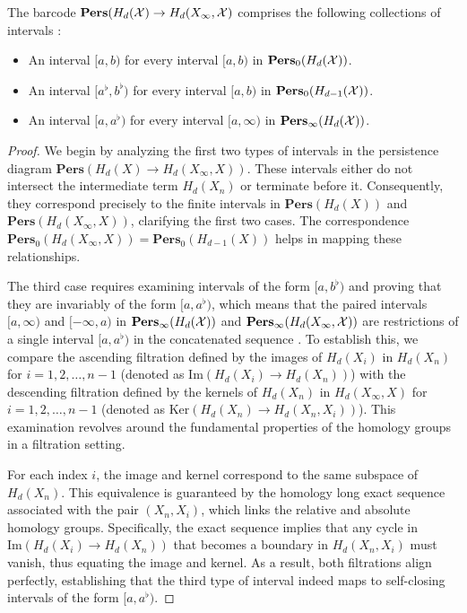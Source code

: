 \begin{corollary}
	The barcode $\textbf{Pers}(H_{d}({\mathcal{X}}) \rightarrow H_{d}(X_{\infty}, {\mathcal{X}})$ comprises
	the following collections of intervals \cite[§2.5]{de2011dualities}:
	\begin{itemize}
		\item An interval $[a,b)$ for every interval $[a,b)$ in $\textbf{Pers}_{0}(H_{d}
			({\mathcal{X}}))$.

		\item An interval $[a^{\flat}, b^{\flat})$ for every interval $[a,b)$ in $\textbf
			{Pers}_{0}(H_{d-1}({\mathcal{X}}))$.

		\item An interval $[a,a^{\flat})$ for every interval $[a,\infty)$ in $\textbf
			{Pers}_{\infty}(H_{d}({\mathcal{X}}))$.
	\end{itemize}
\end{corollary}

\begin{proof}
	We begin by analyzing the first two types of intervals in the persistence diagram
	$\textbf{Pers}(H_{d}(X) \to H_{d}(X_{\infty}, X))$. These intervals either do
	not intersect the intermediate term $H_{d}(X_{n})$ or terminate before it. Consequently,
	they correspond precisely to the finite intervals in $\textbf{Pers}(H_{d}(X))$
	and $\textbf{Pers}(H_{d}(X_{\infty}, X))$, clarifying the first two cases. The
	correspondence
	$\textbf{Pers}_{0}(H_{d}(X_{\infty}, X)) = \textbf{Pers}_{0}(H_{d-1}(X))$
	helps in mapping these relationships.

	The third case requires examining intervals of the form $[a, b^{\flat})$ and
	proving that they are invariably of the form $[a, a^{\flat})$, which means that
	the paired intervals $[a,\infty)$ and $[-\infty,a)$ in $\textbf{Pers}_{\infty}(
	H_{d}({\mathcal{X}}))$ and $\textbf{Pers}_{\infty}(H_{d}(X_{\infty}, {\mathcal{X}}))$ are restrictions
	of a single interval $[a,a^{\flat})$ in the concatenated sequence \cite[p.6]{de2011dualities}.
	To establish this, we compare the ascending filtration defined by the images of
	$H_{d}(X_{i})$ in $H_{d}(X_{n})$ for $i = 1, 2, \ldots, n-1$ (denoted as
	$\text{Im}(H_{d}(X_{i}) \to H_{d}(X_{n}))$) with the descending filtration defined
	by the kernels of $H_{d}(X_{n})$ in $H_{d}(X_{\infty}, X)$ for $i = 1, 2, \ldots
	, n-1$ (denoted as $\text{Ker}(H_{d}(X_{n}) \to H_{d}(X_{n}, X_{i}))$). This
	examination revolves around the fundamental properties of the homology groups
	in a filtration setting.

	For each index $i$, the image and kernel correspond to the same subspace of $H_{d}
	(X_{n})$. This equivalence is guaranteed by the homology long exact sequence
	associated with the pair $(X_{n}, X_{i})$, which links the relative and absolute
	homology groups. Specifically, the exact sequence implies that any cycle in $\text{Im}
	(H_{d}(X_{i}) \to H_{d}(X_{n}))$ that becomes a boundary in $H_{d}(X_{n}, X_{i}
	)$ must vanish, thus equating the image and kernel. As a result, both
	filtrations align perfectly, establishing that the third type of interval indeed
	maps to self-closing intervals of the form $[a, a^{\flat})$.
\end{proof}

